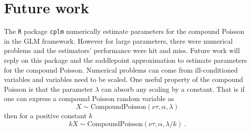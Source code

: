 \documentclass[a4paper]{proc}
\begin{document}
\section{Future work}
The \texttt{R} package \texttt{cplm} \cite{zhang2013likelihood} numerically estimate parameters for the compound Poisson in the GLM framework. However for large parameters, there were numerical problems and the estimators' performance were hit and miss. Future work will reply on this package and the saddlepoint approximation to estimate parameters for the compound Poisson. Numerical problems can come from ill-conditioned variables and variables need to be scaled. One useful property of the compound Poisson is that the parameter $\lambda$ can absorb any scaling by a constant. That is if one can express a compound Poisson random variable as
\begin{equation}
X\sim\text{CompoundPoisson}\left(\nu\tau,\alpha,\lambda\right)
\end{equation}
then for a positive constant $k$
\begin{equation}
kX\sim\text{CompoundPoisson}\left(\nu\tau,\alpha,\lambda/k\right) \ .
\end{equation}



\end{document}
